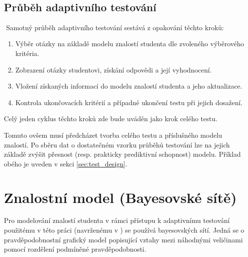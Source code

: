 \documentclass[a4paper,twoside,12pt]{scrbook}
\begin{document}
 \subsection{Průběh adaptivního testování}
 Samotný průběh adaptivního testování sestává z opakování těchto kroků: \cite{plajner16}
\begin{enumerate}
	\item Výběr otázky na základě modelu znalostí studenta dle zvoleného výběrového kritéria.
	\item Zobrazení otázky studentovi, získání odpovědi a její vyhodnocení.
	\item Vložení získaných informací do modelu znalostí studenta a jeho aktualizace.
	\item Kontrola ukončovacích kritérií a případné ukončení testu při jejich dosažení.
\end{enumerate}
Celý jeden cyklus těchto kroků zde bude uváděn jako krok celého testu.

Tomuto ovšem musí předcházet tvorba celého testu a příslušného modelu znalostí. Po sběru dat o dostatečném vzorku průběhů testování lze na jejich základě zvýšit přesnost (resp. prakticky prediktivní schopnost) modelu. Příklad obého je uveden v sekci \ref{sec:test_design}. %
%



\section{Znalostní model (Bayesovské sítě)}
Pro modelování znalostí studenta v rámci přístupu k adaptivnímu testování použitému v této práci (navrženému v \cite{almond_tlustospis}) se používá bayesovských sítí. Jedná se o pravděpodobnostní grafický model popisující vztahy mezi náhodnými veličinami pomocí rozdělení podmíněné pravděpodobnosti.
\end{document}
